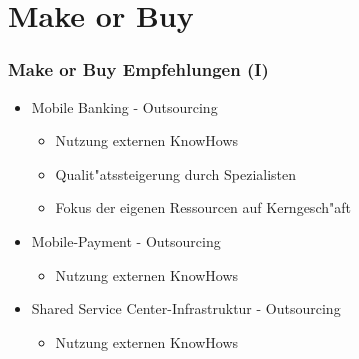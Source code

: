 \documentclass{beamer}
\begin{document}
\section{Make or Buy}
\begin{frame}[plain]
  \frametitle{Make or Buy Empfehlungen (I)}
  \begin{itemize}

	\item Mobile Banking - Outsourcing
		\begin{itemize}
			\item Nutzung externen KnowHows
			\item Qualit"atssteigerung durch Spezialisten
			\item Fokus der eigenen Ressourcen auf Kerngesch"aft\vspace{2mm}
		\end{itemize}
	\item Mobile-Payment - Outsourcing
		\begin{itemize}
			\item Nutzung externen KnowHows\vspace{2mm}
		\end{itemize}
	\item Shared Service Center-Infrastruktur - Outsourcing
			\begin{itemize}
			\item Nutzung externen KnowHows\vspace{2mm}
		\end{itemize}

  \end{itemize}
\end{frame}
\end{document}

